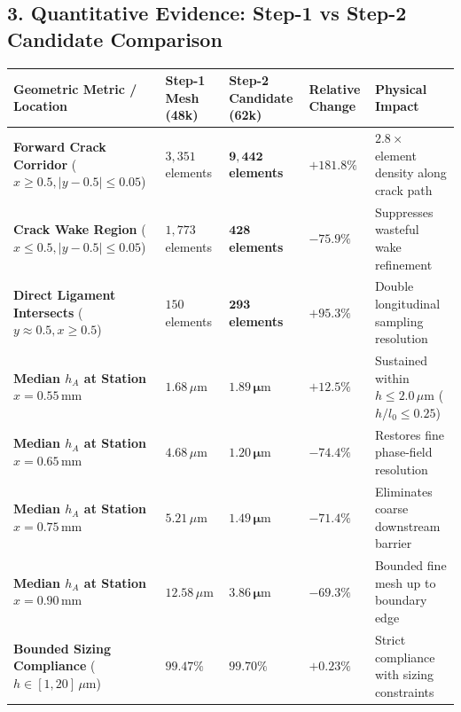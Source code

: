 \documentclass[10pt,a4paper]{article}
\begin{document}
\subsection*{3. Quantitative Evidence: Step-1 vs Step-2 Candidate Comparison}
\vspace{-0.25em}
\begin{table}[h!]
  \centering
  \scriptsize
  \renewcommand{\arraystretch}{1.02}
  \begin{tabularx}{\textwidth}{L{48mm} C{22mm} C{22mm} C{18mm} X}
    \toprule
    \textbf{Geometric Metric / Location} & \textbf{Step-1 Mesh (48k)} & \textbf{Step-2 Candidate (62k)} & \textbf{Relative Change} & \textbf{Physical Impact} \\
    \midrule
    \textbf{Forward Crack Corridor} ($x \ge 0.5, |y-0.5| \le 0.05$) & $3{,}351$ elements & $\mathbf{9{,}442}$ \textbf{elements} & $\mathbf{+181.8\%}$ & $2.8\times$ element density along crack path \\
    \textbf{Crack Wake Region} ($x \le 0.5, |y-0.5| \le 0.05$) & $1{,}773$ elements & $\mathbf{428}$ \textbf{elements} & $\mathbf{-75.9\%}$ & Suppresses wasteful wake refinement \\
    \textbf{Direct Ligament Intersects} ($y \approx 0.5, x \ge 0.5$) & $150$ elements & $\mathbf{293}$ \textbf{elements} & $\mathbf{+95.3\%}$ & Double longitudinal sampling resolution \\
    \midrule
    \textbf{Median $h_A$ at Station $x = 0.55\,\mathrm{mm}$} & $1.68\,\mu\mathrm{m}$ & $\mathbf{1.89\,\mu\mathrm{m}}$ & $+12.5\%$ & Sustained within $h \le 2.0\,\mu\mathrm{m}$ ($h/l_0 \le 0.25$) \\
    \textbf{Median $h_A$ at Station $x = 0.65\,\mathrm{mm}$} & $4.68\,\mu\mathrm{m}$ & $\mathbf{1.20\,\mu\mathrm{m}}$ & $\mathbf{-74.4\%}$ & Restores fine phase-field resolution \\
    \textbf{Median $h_A$ at Station $x = 0.75\,\mathrm{mm}$} & $5.21\,\mu\mathrm{m}$ & $\mathbf{1.49\,\mu\mathrm{m}}$ & $\mathbf{-71.4\%}$ & Eliminates coarse downstream barrier \\
    \textbf{Median $h_A$ at Station $x = 0.90\,\mathrm{mm}$} & $12.58\,\mu\mathrm{m}$ & $\mathbf{3.86\,\mu\mathrm{m}}$ & $\mathbf{-69.3\%}$ & Bounded fine mesh up to boundary edge \\
    \midrule
    \textbf{Bounded Sizing Compliance} ($h \in [1, 20]\,\mu\mathrm{m}$) & $99.47\%$ & $\mathbf{99.70\%}$ & $+0.23\%$ & Strict compliance with sizing constraints \\
    \bottomrule
  \end{tabularx}
\end{table}
\end{document}
